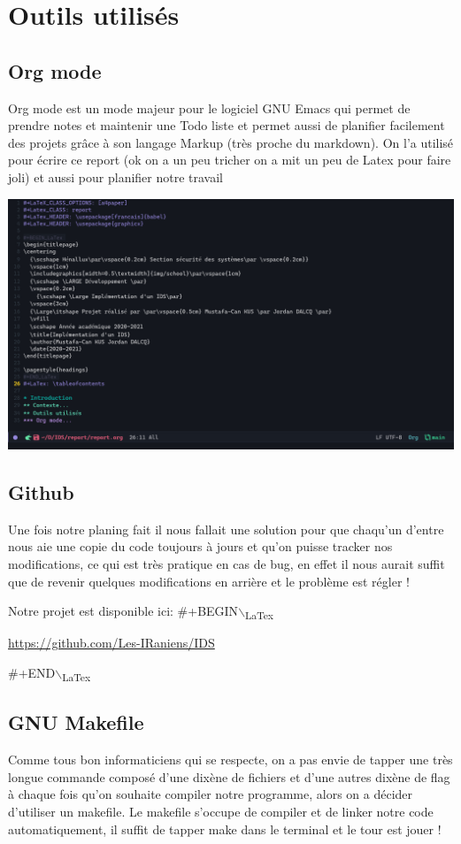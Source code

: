 \documentclass[a4paper]{report}
\begin{document}
\chapter{Outils utilisés}
\label{sec:orgdbb8348}
\section{Org mode}
\label{sec:org15cdba8}
Org mode est un mode majeur pour le logiciel GNU Emacs qui permet de prendre notes et maintenir une Todo liste et permet aussi de planifier facilement des projets
grâce à son langage Markup (très proche du markdown). On l'a utilisé pour écrire ce report (ok on a un peu tricher on a mit un peu de Latex pour faire joli) et aussi
pour planifier notre travail 

\begin{center}
\includegraphics[width=.9\linewidth]{./img/org.png}
\end{center}
\section{Github}
\label{sec:org80c92bc}
Une fois notre planing fait il nous fallait une solution pour que chaqu'un d'entre nous aie une copie du code toujours à jours 
et qu'on puisse tracker nos modifications, ce qui est très pratique en cas de bug, en effet il nous aurait suffit que de revenir 
quelques modifications en arrière et le problème est régler !

Notre projet est disponible ici:
\#+BEGIN$\backslash$\textsubscript{LaTex}
\begin{center}
    {\small \url{https://github.com/Les-IRaniens/IDS}}
\end{center}
\#+END$\backslash$\textsubscript{LaTex}
\section{GNU Makefile}
\label{sec:org768768b}
Comme tous bon informaticiens qui se respecte, on a pas envie de tapper une très longue commande composé d'une dixène de fichiers et d'une
autres dixène de flag à chaque fois qu'on souhaite compiler notre programme, alors on a décider d'utiliser un makefile. 
Le makefile s'occupe de compiler et de linker notre code automatiquement, il suffit de tapper make dans le terminal et le tour est jouer !
\end{document}
